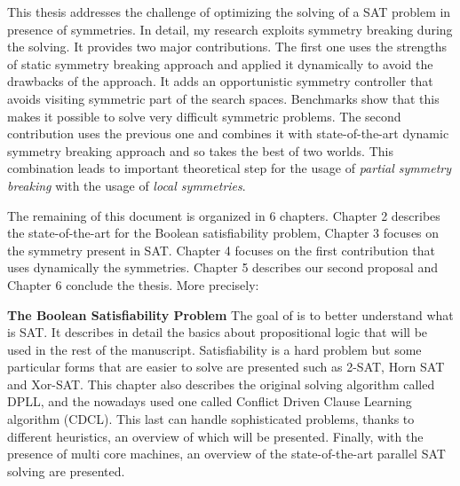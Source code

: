 %
%
%
This thesis addresses the challenge of optimizing the solving of a SAT problem in presence of
symmetries. In detail, my research exploits symmetry breaking during the solving.
It provides two major contributions. The first one uses the strengths of static symmetry 
breaking approach and applied it dynamically to avoid the drawbacks of the approach. It adds an opportunistic symmetry controller that avoids visiting symmetric part of the search spaces. Benchmarks show that this makes it possible
 to solve very difficult symmetric problems.
The second contribution uses the previous one and combines it with state-of-the-art dynamic 
symmetry breaking approach and so takes the best of two worlds. This combination leads to 
important theoretical step for the usage of \emph{partial symmetry breaking} with the usage of 
\emph{local symmetries}. 
 
The remaining of this document is organized in 6 chapters. Chapter 2 describes the state-of-the-art
 for the Boolean satisfiability problem, Chapter 3 focuses on the symmetry present in SAT.
Chapter 4 focuses on the first contribution that uses dynamically the symmetries.
Chapter 5 describes our second proposal and Chapter 6 conclude the thesis. More precisely:
 
\textbf{The Boolean Satisfiability Problem}
The goal of  is to better understand what is SAT. 
It describes in detail the basics
about propositional logic that will be used in the rest of the manuscript. Satisfiability is a hard
problem but some particular forms that are easier to solve are presented such as 2-SAT, Horn SAT and Xor-SAT.
This chapter also describes the original solving algorithm called DPLL, and the
nowadays used one called Conflict Driven Clause Learning algorithm (CDCL).
This last can handle sophisticated problems, thanks to different heuristics, 
an overview of which will be presented. Finally, with the presence of multi
core machines, an overview of the state-of-the-art parallel SAT solving are presented.

